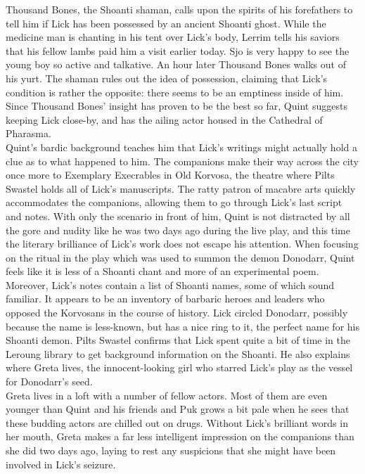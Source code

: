 Thousand Bones, the Shoanti shaman, calls upon the spirits of his forefathers to tell him if Lick has been possessed by an ancient Shoanti ghost. While the medicine man is chanting in his tent over Lick's body, Lerrim tells his saviors that his fellow lambs paid him a visit earlier today. Sjo is very happy to see the young boy so active and talkative. An hour later Thousand Bones walks out of his yurt. The shaman rules out the idea of possession, claiming that Lick's condition is rather the opposite: there seems to be an emptiness inside of him. Since Thousand Bones' insight has proven to be the best so far, Quint suggests keeping Lick close-by, and has the ailing actor housed in the Cathedral of Pharasma.\\

Quint's bardic background teaches him that Lick's writings might actually hold a clue as to what happened to him. The companions make their way across the city once more to Exemplary Execrables in Old Korvosa, the theatre where Pilts Swastel holds all of Lick's manuscripts. The ratty patron of macabre arts quickly accommodates the companions, allowing them to go through Lick's last script and notes. With only the scenario in front of him, Quint is not distracted by all the gore and nudity like he was two days ago during the live play, and this time the literary brilliance of Lick's work does not escape his attention. When focusing on the ritual in the play which was used to summon the demon Donodarr, Quint feels like it is less of a Shoanti chant and more of an experimental poem. Moreover, Lick's notes contain a list of Shoanti names, some of which sound familiar. It appears to be an inventory of barbaric heroes and leaders who opposed the Korvosans in the course of history. Lick circled Donodarr, possibly because the name is less-known, but has a nice ring to it, the perfect name for his Shoanti demon. Pilts Swastel confirms that Lick spent quite a bit of time in the Leroung library to get background information on the Shoanti. He also explains where Greta lives, the innocent-looking girl who starred Lick's play as the vessel for Donodarr's seed.\\

Greta lives in a loft with a number of fellow actors. Most of them are even younger than Quint and his friends and Puk grows a bit pale when he sees that these budding actors are chilled out on drugs. Without Lick's brilliant words in her mouth, Greta makes a far less intelligent impression on the companions than she did two days ago, laying to rest any suspicions that she might have been involved in Lick's seizure.\\

